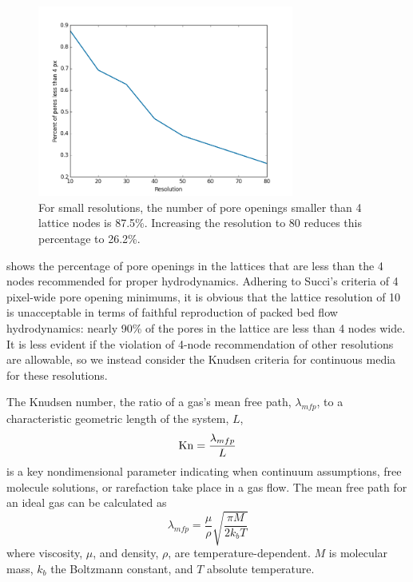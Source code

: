 \begin{figure}[h]
    \centering
    \includegraphics[width=0.75\textwidth]{figures/lbm/percent-pores-under-4px}
    \caption{For small resolutions, the number of pore openings smaller than 4 lattice nodes is 87.5\%. Increasing the resolution to 80 reduces this percentage to 26.2\%.}\label{fig:percent-pores-under-4px}
\end{figure}

 shows the percentage of pore openings in the lattices that are less than the 4 nodes recommended for proper hydrodynamics. Adhering to Succi's criteria of 4 pixel-wide pore opening minimums, it is obvious that the lattice resolution of 10 is unacceptable in terms of faithful reproduction of packed bed flow hydrodynamics: nearly 90\% of the pores in the lattice are less than 4 nodes wide. It is less evident if the violation of 4-node recommendation of other resolutions are allowable, so we instead consider the Knudsen criteria for continuous media for these resolutions.

The Knudsen number, the ratio of a gas's mean free path, $\lambda_{mfp}$, to a characteristic geometric length of the system, $L$, 
\begin{equation}
\mathrm{Kn} = \frac{\lambda_{mfp}}{L}
\end{equation}
is a key nondimensional parameter indicating when continuum assumptions, free molecule solutions, or rarefaction take place in a gas flow. The mean free path for an ideal gas can be calculated as
\begin{equation}
\lambda_{mfp} = \frac{\mu}{\rho}\sqrt{\frac{\pi M}{2k_bT}}
\end{equation}
where viscosity, $\mu$, and density, $\rho$, are temperature-dependent. $M$ is molecular mass, $k_b$ the Boltzmann constant, and $T$ absolute temperature.

